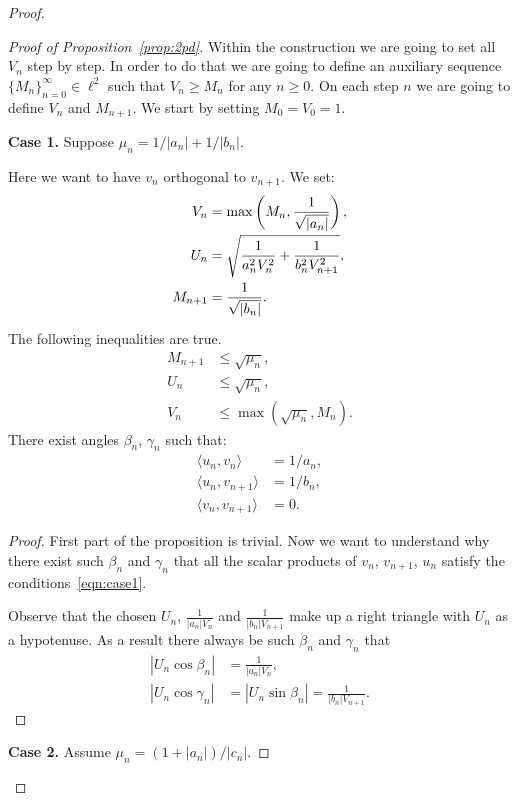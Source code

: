 \begin{proof}
\begin{proof}[Proof of Proposition~\ref{prop:2pd}]
        Within the construction we are going to set all $V_n$ step by step.
        In order to do that we are going to define an auxiliary sequence $\{M_n\}_{n=0}^\infty \in \ell^2$ such that $V_n \geq M_n$ for any $n \geq 0$.
        On each step $n$ we are going to define $V_n$ and $M_{n+1}$.
        We start by setting $M_0 = V_0 = 1$.

        \noindent\textbf{Case 1.} Suppose $\mu_n = 1/|a_n| + 1/|b_n|$.

          Here we want to have $v_n$ orthogonal to $v_{n+1}$.
          We set:
          \begin{align*}
              V_n &= \max\left(M_n, \frac{1}{\sqrt{\smash[b]{|a_n|}}}\right),\\
              U_n &= \sqrt{\frac{1}{a_n^2 V_n^2} + \frac{1}{b_n^2 V_{n+1}^2}},\\
              M_{n+1} &= \frac{1}{\sqrt{\smash[b]{|b_n|}}}.
          \end{align*}
          \begin{prop}
            The following inequalities are true.
            \begin{align*}
              M_{n+1} &\leq \sqrt{\mu_n},\\
              U_n &\leq \sqrt{\mu_n},\\
              V_n &\leq \max(\sqrt{\mu_n}, M_n).
            \end{align*}
            There exist angles $\beta_n$, $\gamma_n$ such that:
            \begin{equation}
              \label{eqn:case1}
              \begin{aligned}
                \langle u_n, v_n \rangle &= 1/a_n,\\
                \langle u_n, v_{n+1} \rangle &= 1/b_n,\\
                \langle v_n, v_{n+1} \rangle &= 0.
              \end{aligned}
            \end{equation}
          \end{prop}
          \begin{proof}
            First part of the proposition is trivial.
            Now we want to understand why there exist such $\beta_n$ and $\gamma_n$ that all the scalar products of
              $v_n$, $v_{n+1}$, $u_n$ satisfy the conditions~\eqref{eqn:case1}.

            Observe that the chosen $U_n$, $\frac{1}{|a_n| V_n}$ and $\frac{1}{|b_n| V_{n+1}}$
              make up a right triangle with $U_n$ as a hypotenuse.
            As a result there always be such $\beta_n$ and $\gamma_n$ that
            \begin{align*}
              |U_n \cos{\beta_n}| &= \frac{1}{|a_n|V_n},\\
              \left|U_n \cos{\gamma_n}\right| &= \left|U_n \sin{\beta_n}\right| = \frac{1}{|b_n|V_{n+1}}.
            \end{align*}
          \end{proof}
        \noindent\textbf{Case 2.} Assume $\mu_n = (1 + |a_n|)/|c_n|$.


\end{proof}
\end{proof}
